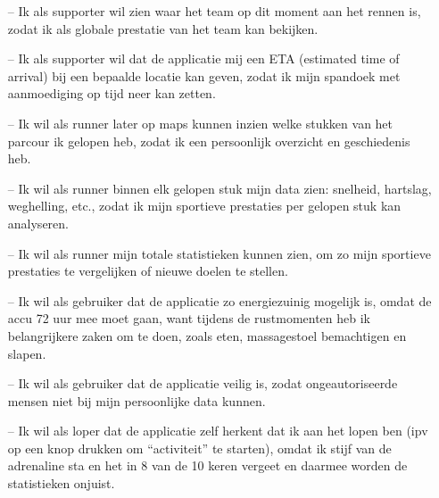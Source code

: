 \documentclass[../main.tex]{subfiles}
\begin{document}
	\begin{itemize}
		\item[--] Ik als supporter wil zien waar het team op dit moment aan het rennen is, zodat ik als globale
		prestatie van het team kan bekijken.
		\item[--] Ik als supporter wil dat de applicatie mij een ETA (estimated time of arrival) bij een bepaalde locatie
		kan geven, zodat ik mijn spandoek met aanmoediging op tijd neer kan zetten.
		\item[--] Ik wil als runner later op maps kunnen inzien welke stukken van het parcour ik gelopen heb, zodat ik
		een persoonlijk overzicht en geschiedenis heb.
		\item[--] Ik wil als runner binnen elk gelopen stuk mijn data zien: snelheid, hartslag, weghelling, etc., zodat ik
		mijn sportieve prestaties per gelopen stuk kan analyseren.
		\item[--] Ik wil als runner mijn totale statistieken kunnen zien, om zo mijn sportieve prestaties te vergelijken
		of nieuwe doelen te stellen.
		\item[--] Ik wil als gebruiker dat de applicatie zo energiezuinig mogelijk is, omdat de accu 72 uur mee moet
		gaan, want tijdens de rustmomenten heb ik belangrijkere zaken om te doen, zoals eten,
		massagestoel bemachtigen en slapen.
		\item[--] Ik wil als gebruiker dat de applicatie veilig is, zodat ongeautoriseerde mensen niet bij mijn
		persoonlijke data kunnen.
		\item[--] Ik wil als loper dat de applicatie zelf herkent dat ik aan het lopen ben (ipv op een knop drukken om
		“activiteit” te starten), omdat ik stijf van de adrenaline sta en het in 8 van de 10 keren vergeet en
		daarmee worden de statistieken onjuist.
	\end{itemize}
\end{document}
